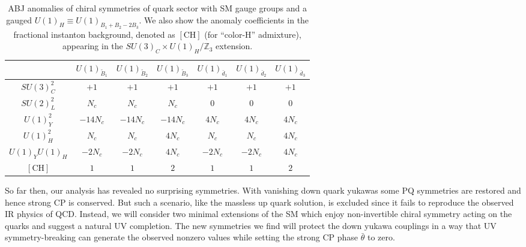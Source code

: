 \documentclass[11pt,a4paper]{article}
\begin{document}
\begin{table}[t]\centering
\large
\begin{tabular}{|c|c|c|c|c|c|c|}  \hline
 & $U(1)_{\tilde{B}_1}$  & $U(1)_{\tilde{B}_2}$&$U(1)_{\tilde{B}_3}$ & $U(1)_{\bar d_1}$  & $U(1)_{\bar d_2}$&$U(1)_{\bar d_3}$ \\ \hline
 
$SU(3)_C^{2}$ & $+1$ & $+1$ & $+1$ & $+1$ & $+1$ & $+1$\\ \hline 

$SU(2)_L^{2}$ & $N_c$ & $N_c$ & $N_c$ & $0$ & $0$ & $0$\\ \hline 

$U(1)_Y^{2}$ & $-14 N_c$ & $-14 N_c$ & $-14 N_c$ & $4 N_c$ & $4 N_c$ & $4 N_c$\\ \hline 

$U(1)_{H}^{2}$ & $N_c$ & $N_c$ & $4 N_c$ & $N_c$ & $N_c$ & $4 N_c$\\ \hline 

$U(1)_{Y}U(1)_{H}$ & $-2N_c$ & $-2N_c$ & $4N_{c}$ & $-2N_c$ & $-2N_c$ & $4 N_c$\\ \hline 

$[\text{CH}]$ & $1$ & $1$ & $2$ & $1$ & $1$ & $2$\\ \hline 

\end{tabular}\caption{ABJ anomalies of chiral symmetries of quark sector with SM gauge groups and a gauged $U(1)_{H} \equiv U(1)_{B_1 + B_2 - 2 B_3}$. We also show the anomaly coefficients in the fractional instanton background, denoted as $[\text{CH}]$ (for ``color-H'' admixture), appearing in the $SU(3)_C \times U(1)_H / \mathbb{Z}_3$ extension.}
\label{tab:IRanomaly}
\end{table}

So far then, our analysis has revealed no surprising symmetries.  With vanishing down quark yukawas some PQ symmetries are restored and hence strong CP is conserved.  
But such a scenario, like the massless up quark solution, is excluded since it fails to reproduce the observed IR physics of QCD.  Instead, we will consider two minimal extensions of the SM which enjoy non-invertible chiral symmetry acting on the quarks and suggest a natural UV completion. The new symmetries we find will protect the down yukawa couplings in a way that UV symmetry-breaking can generate the observed nonzero values while setting the strong CP phase $\bar{\theta}$ to zero. 
\end{document}
